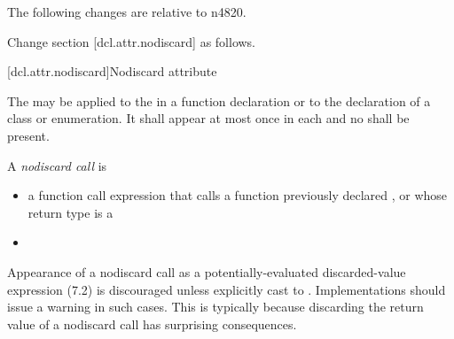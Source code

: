 \documentclass[ebook,11pt,article]{memoir}
\begin{document}
The following changes are relative to n4820. 

Change section [dcl.attr.nodiscard] as follows. 

[dcl.attr.nodiscard]{Nodiscard attribute}%

\pnum
The  
may be applied to the 
in a function declaration or to the declaration of a class or enumeration.
It shall appear at most once in each  and
no  shall be present.

\pnum
\begin{note}
A \emph{nodiscard call} is 
\begin{itemize}
\item a function call expression 
that calls a function 
previously declared , or
whose return type is a 
\item
{}
\end{itemize} 
Appearance of a nodiscard call as
a potentially-evaluated discarded-value expression (7.2)%
is discouraged unless explicitly cast to .
Implementations should issue a warning in such cases.
This is typically because discarding the return value
of a nodiscard call has surprising consequences.
\end{note}
\end{document}
